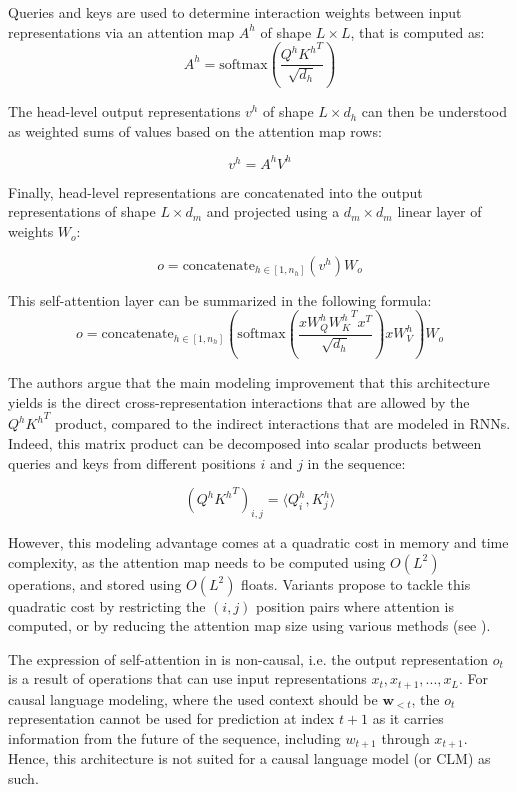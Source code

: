 Queries and keys are used to determine interaction weights between input representations via an attention map $A^h$ of shape $L \times L$, that is computed as:
$$
A^h = \text{softmax} \left(\frac{Q^h {K^h}^T}{\sqrt{d_h}}\right)
$$

The head-level output representations $v^h$ of shape $L \times d_h$ can then be understood as weighted sums of values based on the attention map rows:

$$
v^h = A^h V^h
$$

Finally, head-level representations are concatenated into the output representations of shape $L \times d_m$ and projected using a $d_m \times d_m$ linear layer of weights $W_o$:

$$
o = \text{concatenate}_{h\in [1, n_h]}(v^h) W_o
$$

This self-attention layer can be summarized in the following formula:
\begin{equation}
    \label{eq:self_attn}
o = \text{concatenate}_{h\in [1, n_h]} \left( \text{softmax} \left(\frac{x W_Q^h {W_K^h}^T x^T}{\sqrt{d_h}}\right) x W_V^h \right) W_o
\end{equation}


The authors argue that the main modeling improvement that this architecture yields is the direct cross-representation interactions that are allowed by the $Q^h {K^h}^T$ product, compared to the indirect interactions that are modeled in RNNs. Indeed, this matrix product can be decomposed into scalar products between queries and keys from different positions $i$ and $j$ in the sequence:

$$
(Q^h {K^h}^T)_{i, j} = \langle Q^h_i , K^h_j \rangle
$$

However, this modeling advantage comes at a quadratic cost in memory and time complexity, as the attention map needs to be computed using $O(L^2)$ operations, and stored using $O(L^2)$ floats. Variants propose to tackle this quadratic cost by restricting the $(i, j)$ position pairs where attention is computed, or by reducing the attention map size using various methods (see ).

The expression of self-attention in  is non-causal, i.e. the output representation $o_t$ is a result of operations that can use input representations $x_t, x_{t+1}, ..., x_L$. For causal language modeling, where the used context should be $\mathbf{w}_{< t}$, the $o_t$ representation cannot be used for prediction at index $t + 1$ as it carries information from the future of the sequence, including $w_{t+1}$ through $x_{t+1}$. Hence, this architecture is not suited for a causal language model (or CLM) as such.


